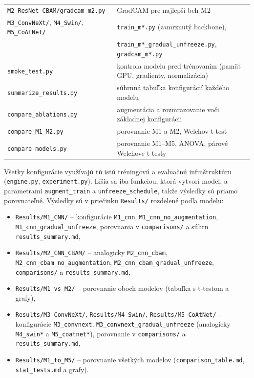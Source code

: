 \begin{table}[H]
\begin{tabular}{ll}
        \texttt{M2\_ResNet\_CBAM/gradcam\_m2.py} & GradCAM pre najlepší beh M2 \\
        \texttt{M3\_ConvNeXt/}, \texttt{M4\_Swin/}, \texttt{M5\_CoAtNet/} & \texttt{train\_m*.py} (zamrznutý backbone), \\
         & \texttt{train\_m*\_gradual\_unfreeze.py}, \texttt{gradcam\_m*.py} \\
        \texttt{smoke\_test.py} & kontrola modelu pred trénovaním (pamäť GPU, gradienty, normalizácia) \\
        \texttt{summarize\_results.py} & súhrnná tabuľka konfigurácií každého modelu \\
        \texttt{compare\_ablations.py} & augmentácia a rozmrazovanie voči základnej konfigurácii \\
        \texttt{compare\_M1\_M2.py} & porovnanie M1 a M2, Welchov t-test \\
        \texttt{compare\_models.py} & porovnanie M1--M5, ANOVA, párové Welchove t-testy \\
        \bottomrule
    \end{tabular}
\end{table}

Všetky konfigurácie využívajú tú istú tréningovú a evaluačnú infraštruktúru
(\texttt{engine.py}, \texttt{experiment.py}). Líšia sa iba funkciou, ktorá
vytvorí model, a parametrami \texttt{augment\_train}
a \texttt{unfreeze\_schedule}, takže výsledky sú priamo porovnateľné.
Výsledky sú v priečinku \texttt{Results/} rozdelené podľa modelu:

\begin{itemize}
    \item \texttt{Results/M1\_CNN/} -- konfigurácie \texttt{M1\_cnn},
          \texttt{M1\_cnn\_no\_augmentation}, \texttt{M1\_cnn\_gradual\_unfreeze},
          porovnania v \texttt{comparisons/} a súhrn \texttt{results\_summary.md},
    \item \texttt{Results/M2\_CNN\_CBAM/} -- analogicky \texttt{M2\_cnn\_cbam},
          \texttt{M2\_cnn\_cbam\_no\_augmentation},
          \texttt{M2\_cnn\_cbam\_gradual\_unfreeze}, \texttt{comparisons/}
          a \texttt{results\_summary.md},
    \item \texttt{Results/M1\_vs\_M2/} -- porovnanie oboch modelov
          (tabuľka s t-testom a grafy),
    \item \texttt{Results/M3\_ConvNeXt/}, \texttt{Results/M4\_Swin/},
          \texttt{Results/M5\_CoAtNet/} -- konfigurácie \texttt{M3\_convnext},
          \texttt{M3\_convnext\_gradual\_unfreeze} (analogicky
          \texttt{M4\_swin*} a \texttt{M5\_coatnet*}), porovnanie
          v \texttt{comparisons/} a \texttt{results\_summary.md},
    \item \texttt{Results/M1\_to\_M5/} -- porovnanie všetkých modelov
          (\texttt{comparison\_table.md}, \texttt{stat\_tests.md} a grafy).
\end{itemize}

